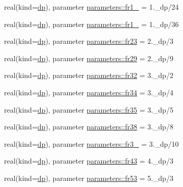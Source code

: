 \begin{DoxyCompactItemize}
real(kind=\mbox{\hyperlink{namespaceparameters_a52f8c6351fd79345d8811e065bcbbb37}{dp}}), parameter \mbox{\hyperlink{group__FRACTIONS_ga6f3d13faca548dd3fb16645525651743}{parameters\+::fr1\+\_}} = 1.\+\_\+dp/24
\item 
real(kind=\mbox{\hyperlink{namespaceparameters_a52f8c6351fd79345d8811e065bcbbb37}{dp}}), parameter \mbox{\hyperlink{group__FRACTIONS_gaa55c45ce58d2200ffa6ff168d00e94d7}{parameters\+::fr1\+\_}} = 1.\+\_\+dp/36
\item 
real(kind=\mbox{\hyperlink{namespaceparameters_a52f8c6351fd79345d8811e065bcbbb37}{dp}}), parameter \mbox{\hyperlink{group__FRACTIONS_gaf550152b4a78556eab5e45a3505a690e}{parameters\+::fr23}} = 2.\+\_\+dp/3
\item 
real(kind=\mbox{\hyperlink{namespaceparameters_a52f8c6351fd79345d8811e065bcbbb37}{dp}}), parameter \mbox{\hyperlink{group__FRACTIONS_gaae4b443a271ca66ffd82ed02a3062073}{parameters\+::fr29}} = 2.\+\_\+dp/9
\item 
real(kind=\mbox{\hyperlink{namespaceparameters_a52f8c6351fd79345d8811e065bcbbb37}{dp}}), parameter \mbox{\hyperlink{group__FRACTIONS_gadb06185f00fedb4688eb75250f7365de}{parameters\+::fr32}} = 3.\+\_\+dp/2
\item 
real(kind=\mbox{\hyperlink{namespaceparameters_a52f8c6351fd79345d8811e065bcbbb37}{dp}}), parameter \mbox{\hyperlink{group__FRACTIONS_ga8f9972a5fa3d36c2893e702ab70c7fff}{parameters\+::fr34}} = 3.\+\_\+dp/4
\item 
real(kind=\mbox{\hyperlink{namespaceparameters_a52f8c6351fd79345d8811e065bcbbb37}{dp}}), parameter \mbox{\hyperlink{group__FRACTIONS_ga51fd0944911031e89f45e11247545886}{parameters\+::fr35}} = 3.\+\_\+dp/5
\item 
real(kind=\mbox{\hyperlink{namespaceparameters_a52f8c6351fd79345d8811e065bcbbb37}{dp}}), parameter \mbox{\hyperlink{group__FRACTIONS_ga7fcdf682bf3d4c7901343542bcee3976}{parameters\+::fr38}} = 3.\+\_\+dp/8
\item 
real(kind=\mbox{\hyperlink{namespaceparameters_a52f8c6351fd79345d8811e065bcbbb37}{dp}}), parameter \mbox{\hyperlink{group__FRACTIONS_gadb8dc3cfa1864abcbb3226845f3d1953}{parameters\+::fr3\+\_}} = 3.\+\_\+dp/10
\item 
real(kind=\mbox{\hyperlink{namespaceparameters_a52f8c6351fd79345d8811e065bcbbb37}{dp}}), parameter \mbox{\hyperlink{group__FRACTIONS_ga1705bf89adaf6e54bdf027386ecdc5a9}{parameters\+::fr43}} = 4.\+\_\+dp/3
\item 
real(kind=\mbox{\hyperlink{namespaceparameters_a52f8c6351fd79345d8811e065bcbbb37}{dp}}), parameter \mbox{\hyperlink{group__FRACTIONS_ga348f3739fc94f9786aeb6045a5c9c76b}{parameters\+::fr53}} = 5.\+\_\+dp/3

\end{DoxyCompactItemize}
